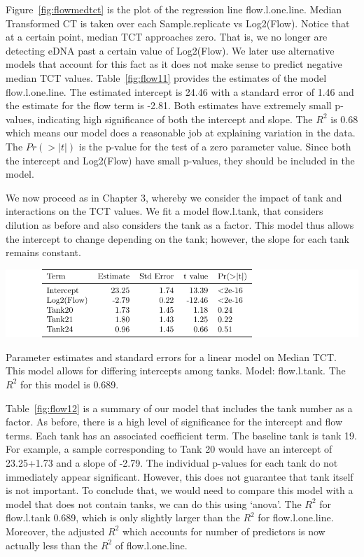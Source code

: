 Figure~\ref{fig:flowmedtct} is the plot of the regression line flow.l.one.line. Median Transformed CT is taken over each Sample.replicate vs Log2(Flow). Notice that at a certain point, median TCT approaches zero. That is, we no longer are detecting eDNA past a certain value of Log2(Flow). We later use alternative models that account for this fact as it does not make sense to predict negative median TCT values. Table~\ref{fig:flow11} provides the estimates of the model flow.l.one.line. The estimated intercept is 24.46 with a standard error of 1.46 and the estimate for the flow term is -2.81. Both estimates have extremely small p-values, indicating high significance of both the intercept and slope. The $R^{2}$ is 0.68 which means our model does a reasonable job at explaining variation in the data. The $Pr(> |t|)$  is the p-value for the test of a zero parameter value. Since both the intercept and Log2(Flow) have small p-values, they should be included in the model.
 


\newpage

We now proceed as in Chapter 3, whereby we consider the impact of tank and interactions on the TCT values.  We fit a model flow.l.tank, that considers dilution as before and also considers the tank as a factor. This model thus allows the intercept to change depending on the tank; however, the slope for each tank remains constant. 

\vspace{5mm}


\begin{table}[H]
\includegraphics{Chapter4Images/flowltank.pdf}
\caption{Parameter estimates and standard errors for a linear model on Median TCT. This model allows for differing intercepts among tanks. Model: flow.l.tank.  The $R^{2}$ for this model is 0.689.}
\label{fig:flow12}
\end{table}

Table~\ref{fig:flow12} is a summary of our model that  includes the tank number as a factor.  As before, there is a high level of significance for the intercept and flow terms. Each tank has an associated coefficient term. The baseline tank is tank 19. For example, a sample corresponding to Tank 20 would have an intercept of 23.25+1.73 and a slope of -2.79. The individual p-values for each tank do not immediately appear significant. However, this does not guarantee that tank itself is not important. To conclude that, we would need to compare this model with a model that does not contain tanks, we can do this using `anova'.  The $R^{2}$ for flow.l.tank 0.689, which is only slightly larger than the $R^{2}$ for flow.l.one.line. Moreover, the adjusted $R^{2}$ which accounts for number of predictors is now actually less than the $R^{2}$ of flow.l.one.line.

